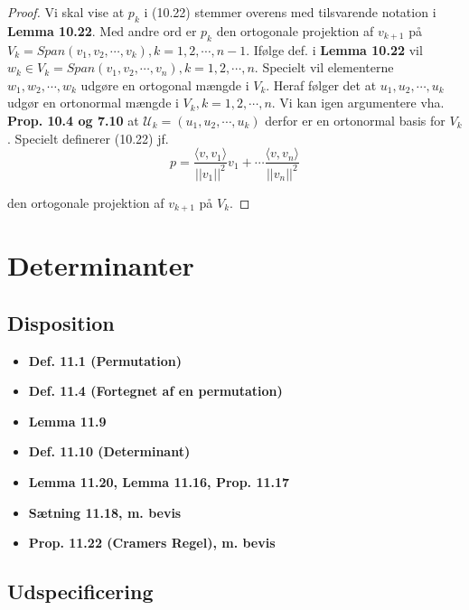 \documentclass[paper=a4, fontsize=11pt]{scrartcl} %
\begin{document}
	\begin{proof}
		
		Vi skal vise at $p_k$ i (10.22) stemmer overens med tilsvarende notation i \textbf{Lemma 10.22}. Med andre ord er $p_k$ den ortogonale projektion af $v_{k+1}$ på $V_k = Span(v_1,v_2,\cdots,v_k), k = 1,2,\cdots,n-1$.
		Ifølge def. i \textbf{Lemma 10.22} vil $w_k \in V_k = Span(v_1,v_2,\cdots,v_n), k = 1,2,\cdots,n$. Specielt vil elementerne $w_1,w_2,\cdots,w_k$ udgøre en ortogonal mængde i $V_k$. Heraf følger det at $u_1,u_2,\cdots,u_k$ udgør en ortonormal mængde i $V_k, k = 1,2,\cdots,n$. Vi kan igen argumentere vha. \textbf{Prop. 10.4 og 7.10} at $\mathcal{U}_k = (u_1,u_2,\cdots,u_k)$ derfor er en ortonormal basis for $V_k$. Specielt definerer (10.22) jf. 
		\[p = \frac{\langle v,v_1\rangle}{||v_1||^2} v_1 + \cdots \frac{\langle v,v_n \rangle}{||v_n||^2}\]
		
		den ortogonale projektion af $v_{k+1}$ på $V_k$.
		
	\end{proof}
	
	
	
	
	\newpage
	
	\section{Determinanter}
	
	\subsection{Disposition}
	
	\begin{itemize}
		\item \textbf{Def. 11.1 (Permutation)}
		\item \textbf{Def. 11.4 (Fortegnet af en permutation)}
		\item \textbf{Lemma 11.9}
		\item \textbf{Def. 11.10 (Determinant)}
		\item \textbf{Lemma 11.20, Lemma 11.16, Prop. 11.17}
		\item \textbf{Sætning 11.18, m. bevis}
		\item \textbf{Prop. 11.22 (Cramers Regel), m. bevis}
	\end{itemize}
	
	\subsection{Udspecificering}
	
\end{document}
